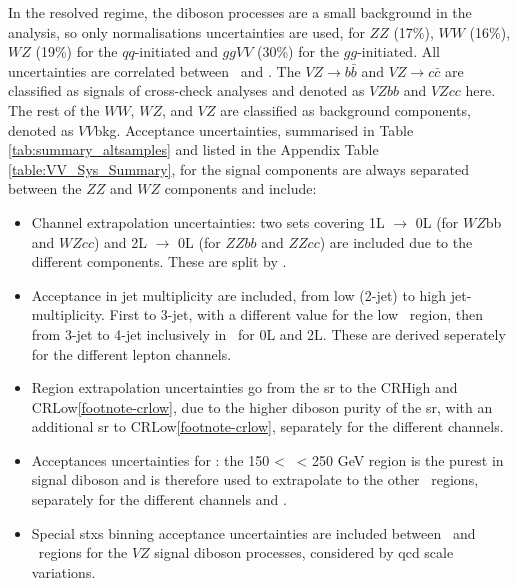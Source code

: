In the resolved regime, the diboson processes are a small background in the analysis, so only normalisations uncertainties are used, for $ZZ$ (17\%), $WW$ (16\%), $WZ$ (19\%) for the $qq$-initiated and $ggVV$ (30\%) for the $gg$-initiated. All uncertainties are correlated between \vhb\ and \vhc. The $VZ \rightarrow b\bar{b}$ and $VZ \rightarrow c\bar{c}$ are classified as signals of cross-check analyses and denoted as $VZbb$ and $VZcc$ here. The rest of the $WW$, $WZ$, and $VZ$ are classified as background components, denoted as $VV$bkg. Acceptance uncertainties, summarised in Table \ref{tab:summary_altsamples} and listed in the Appendix Table \ref{table:VV_Sys_Summary}, for the signal components are always separated between the $ZZ$ and $WZ$ components and include:
\begin{itemize}[leftmargin=*]
    \item Channel extrapolation uncertainties: two sets covering 1L $\rightarrow$ 0L (for $WZ$bb and $WZcc$) and 2L $\rightarrow$ 0L (for $ZZbb$ and $ZZcc$) are included due to the different components. These are split by \nj.
    \item Acceptance in jet multiplicity are included, from low (2-jet) to high jet-multiplicity. First to 3-jet, with a different value for the low \ptv\ region, then from 3-jet to 4-jet inclusively in \ptv\ for 0L and 2L. These are derived seperately for the different lepton channels.
    \item Region extrapolation uncertainties go from the \gls{sr} to the CRHigh and CRLow\cref{footnote-crlow}, due to the higher diboson purity of the \gls{sr}, with an additional \gls{sr} to CRLow\cref{footnote-crlow}, separately for the different channels.
    \item Acceptances uncertainties for \ptv: the 150 < \ptv\ < 250 GeV region is the purest in signal diboson  and is therefore used to extrapolate to the other \ptv\ regions, separately for the different channels and \nj.
    \item Special \gls{stxs} binning acceptance uncertainties are included between \nj\ and \ptv\ regions for the $VZ$ signal diboson processes, considered by \gls{qcd} scale variations. %
\end{itemize}


